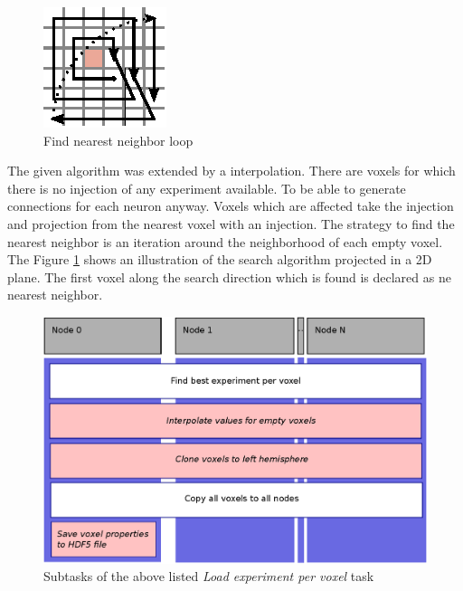 \begin{figure}[ht!]
\centering
\includegraphics[scale=2.5]{pictures/longRange_Nearest_parallelAlg.eps}
\caption{Find nearest neighbor loop}
\label{longrange}
\end{figure}

The given algorithm was extended by a interpolation. There are voxels for which there is no injection of any experiment
available. To be able to generate connections for each neuron anyway. Voxels which are affected take the injection and projection from the nearest voxel with an injection. The strategy to find the nearest neighbor is an iteration around the neighborhood of each empty voxel. The Figure \ref{longrange} shows an illustration of the search algorithm
projected in a 2D plane. The first voxel along the search direction which is found is declared as ne nearest neighbor.


\begin{figure}[ht!]
\centering
\includegraphics[scale=0.5]{pictures/longRange_BestExp_parallelAlg.eps}
\caption{Subtasks of the above listed \emph{Load experiment per voxel} task}
\end{figure}

